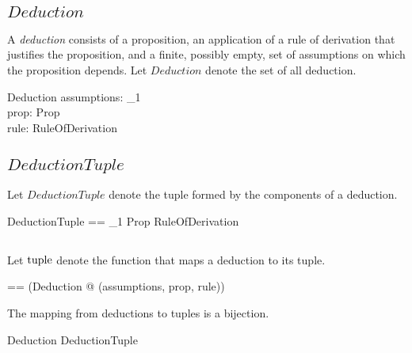 \documentclass[11pt, oneside]{article}
\begin{document}
\subsection{$Deduction$}

A {\it deduction} consists of a proposition, an application of a rule of derivation that justifies the proposition,
and a finite, possibly empty, set of assumptions on which the proposition depends.
Let $Deduction$ denote the set of all deduction.

\begin{schema}{Deduction}
	assumptions: \finset \nat_1 \\
	prop: Prop \\
	rule: RuleOfDerivation
\end{schema}

\subsection{$DeductionTuple$}

Let $DeductionTuple$ denote the tuple formed by the components of a deduction.

\begin{zed}
	DeductionTuple == \finset \nat_1 \cross Prop \cross RuleOfDerivation
\end{zed}

\subsection{}

Let $\operatorname{tuple}$ denote the function that maps a deduction to its tuple.

\begin{zed}
	\deductionTuple == (\lambda Deduction @ (assumptions, prop, rule))
\end{zed}

\begin{remark}
The mapping from deductions to tuples is a bijection.

\begin{zed}
	\deductionTuple \in Deduction \bij DeductionTuple
\end{zed}

\end{remark}

\subsection{}
\end{document}

